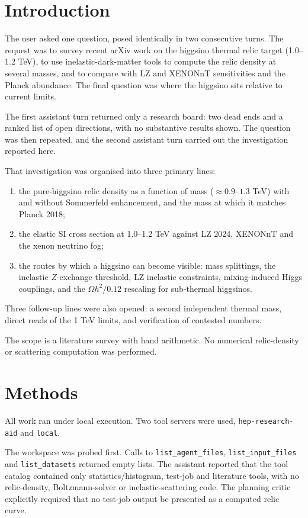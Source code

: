\documentclass[11pt,a4paper]{article}
\begin{document}
\section{Introduction}
The user asked one question, posed identically in two consecutive turns. The request was to survey recent arXiv work on the higgsino thermal relic target (1.0--1.2 TeV), to use inelastic-dark-matter tools to compute the relic density at several masses, and to compare with LZ and XENONnT sensitivities and the Planck abundance. The final question was where the higgsino sits relative to current limits.

The first assistant turn returned only a research board: two dead ends and a ranked list of open directions, with no substantive results shown. The question was then repeated, and the second assistant turn carried out the investigation reported here.

That investigation was organised into three primary lines:
\begin{enumerate}
\item the pure-higgsino relic density as a function of mass ($\approx 0.9$--$1.3$ TeV) with and without Sommerfeld enhancement, and the mass at which it matches Planck 2018;
\item the elastic SI cross section at 1.0--1.2 TeV against LZ 2024, XENONnT and the xenon neutrino fog;
\item the routes by which a higgsino can become visible: mass splittings, the inelastic $Z$-exchange threshold, LZ inelastic constraints, mixing-induced Higgs couplings, and the $\Omega h^2/0.12$ rescaling for sub-thermal higgsinos.
\end{enumerate}
Three follow-up lines were also opened: a second independent thermal mass, direct reads of the 1 TeV limits, and verification of contested numbers.

The scope is a literature survey with hand arithmetic. No numerical relic-density or scattering computation was performed.

\section{Methods}
All work ran under local execution. Two tool servers were used, \texttt{hep-research-aid} and \texttt{local}.

The workspace was probed first. Calls to \texttt{list\_agent\_files}, \texttt{list\_input\_files} and \texttt{list\_datasets} returned empty lists. The assistant reported that the tool catalog contained only statistics/histogram, test-job and literature tools, with no relic-density, Boltzmann-solver or inelastic-scattering code. The planning critic explicitly required that no test-job output be presented as a computed relic curve.
\end{document}
